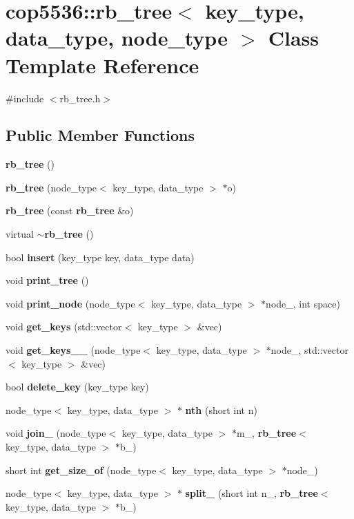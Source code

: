 \section{cop5536\+::rb\+\_\+tree$<$ key\+\_\+type, data\+\_\+type, node\+\_\+type $>$ Class Template Reference}
\label{classcop5536_1_1rb__tree}


{\ttfamily \#include $<$rb\+\_\+tree.\+h$>$}

\subsection*{Public Member Functions}
\begin{DoxyCompactItemize}
\item 
\textbf{ rb\+\_\+tree} ()
\item 
\textbf{ rb\+\_\+tree} (node\+\_\+type$<$ key\+\_\+type, data\+\_\+type $>$ $\ast$o)
\item 
\textbf{ rb\+\_\+tree} (const \textbf{ rb\+\_\+tree} \&o)
\item 
virtual \textbf{ $\sim$rb\+\_\+tree} ()
\item 
bool \textbf{ insert} (key\+\_\+type key, data\+\_\+type data)
\item 
void \textbf{ print\+\_\+tree} ()
\item 
void \textbf{ print\+\_\+node} (node\+\_\+type$<$ key\+\_\+type, data\+\_\+type $>$ $\ast$node\+\_\+, int space)
\item 
void \textbf{ get\+\_\+keys} (std\+::vector$<$ key\+\_\+type $>$ \&vec)
\item 
void \textbf{ get\+\_\+keys\+\_\+\+\_\+} (node\+\_\+type$<$ key\+\_\+type, data\+\_\+type $>$ $\ast$node\+\_\+, std\+::vector$<$ key\+\_\+type $>$ \&vec)
\item 
bool \textbf{ delete\+\_\+key} (key\+\_\+type key)
\item 
node\+\_\+type$<$ key\+\_\+type, data\+\_\+type $>$ $\ast$ \textbf{ nth} (short int n)
\item 
void \textbf{ join\+\_\+} (node\+\_\+type$<$ key\+\_\+type, data\+\_\+type $>$ $\ast$m\+\_\+, \textbf{ rb\+\_\+tree}$<$ key\+\_\+type, data\+\_\+type $>$ $\ast$b\+\_\+)
\item 
short int \textbf{ get\+\_\+size\+\_\+of} (node\+\_\+type$<$ key\+\_\+type, data\+\_\+type $>$ $\ast$node\+\_\+)
\item 
node\+\_\+type$<$ key\+\_\+type, data\+\_\+type $>$ $\ast$ \textbf{ split\+\_\+} (short int n\+\_\+, \textbf{ rb\+\_\+tree}$<$ key\+\_\+type, data\+\_\+type $>$ $\ast$b\+\_\+)

\end{DoxyCompactItemize}
